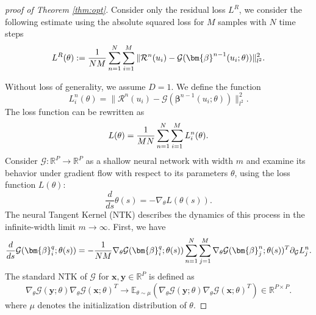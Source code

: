 \documentclass[preprint,12pt]{elsarticle}
\theoremstyle{plain}
\numberwithin{figure}{section}
\numberwithin{table}{section}
\begin{document}
\begin{proof}[proof of Theorem \ref{thm:opt}]

Consider only the residual loss $L^R$, we consider the following estimate using the absolute squared loss for $M$ samples with $N$ time steps
\begin{equation}
    L^R(\theta):=  {1\over NM}\sum_{n=1}^N\sum_{i=1}^M \|\mathcal{R}^n(u_i)- \mathcal{G}({\bm{\beta}}^{n-1}({u}_i;\theta))\|_{l^2}^2.
\end{equation}

    Without loss of generality, we assume $D=1$. We define the function
    \begin{equation}
        L_i^n(\theta) = \|\mathcal{R}^n(u_i)- \mathcal{G}({\bm{\beta}}^{n-1}({u}_i;\theta))\|_{l^2}^2.
    \end{equation}
    The loss function can be rewritten as
	\begin{equation}
		L(\theta) = {1\over MN}\sum_{n=1}^N\sum_{i=1}^M L_i^n(\theta).
	\end{equation}
	Consider $\mathcal{G} : \mathbb{R}^P \to \mathbb{R}^P$ as a shallow neural network with width $m$ and examine its behavior under gradient flow with respect to its parameters $\theta$, using the loss function $L(\theta)$:
	\begin{equation}
		\frac{d}{ds}\theta(s)=-\nabla_\theta L(\theta(s)).
	\end{equation}
	The neural Tangent Kernel (NTK) \cite{jacot2018neural} describes the dynamics of this process in the infinite-width limit $m\rightarrow\infty$. First, we have
	\begin{equation}
		\frac{d}{ds}\mathcal{G}(\bm{\beta}_i^q;\theta(s)) = -{1\over NM}\nabla_\theta \mathcal{G}(\bm{\beta}_i^q;\theta(s))\sum_{n=1}^N\sum_{j=1}^M  \nabla_\theta \mathcal{G}(\bm{\beta}_j^n;\theta(s))^T\partial_{\mathcal{G}}{L}_j^n.
	\end{equation}
	The standard NTK of $\mathcal{G}$ for $\bm{x},\bm{y}\in\mathbb{R}^P$ is defined as
	\begin{equation}
		\nabla_\theta \mathcal{G}(\bm{y};\theta)  \nabla_\theta \mathcal{G}(\bm{x};\theta)^T \rightarrow \mathbb{E}_{\theta\sim \mu}(\nabla_\theta \mathcal{G}(\bm{y};\theta)  \nabla_\theta \mathcal{G}(\bm{x};\theta)^T )\in\mathbb{R}^{P\times P} .
	\end{equation}
	where $\mu$ denotes the initialization distribution of $\theta$.
	

\end{proof}
\end{document}
